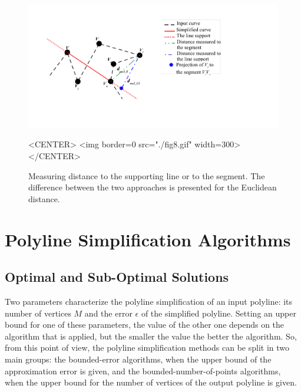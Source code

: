 \begin{figure}[h]
\begin{ccTexOnly}
\begin{center}
\includegraphics[width=12cm]{Polygonal_approximation_d/fig8} 
\end{center}
\end{ccTexOnly}
\caption{Measuring distance to the supporting line or to the segment.
          The difference between the two approaches is presented 
           for the Euclidean distance.
\label{Simplification_Fig_LineSegment}}
\begin{ccHtmlOnly}
<CENTER>
<img border=0 src="./fig8.gif" width=300>
</CENTER>
\end{ccHtmlOnly}
\end{figure}




\section{Polyline Simplification Algorithms}	

\subsection{Optimal and Sub-Optimal Solutions}


Two parameters characterize the polyline simplification of an input
polyline: its number of vertices $M$ and the error $\epsilon$ of
the simplified polyline. Setting an upper bound for one of these
parameters, the value of the other one depends on the algorithm that
is applied, but the smaller the value the better the algorithm. So,
from this point of view, the polyline simplification methods can be
split in two main groups: the bounded-error algorithms, when the upper
bound of the approximation error is given, and the
bounded-number-of-points algorithms, when the upper bound for the
number of vertices of the output polyline is given.

